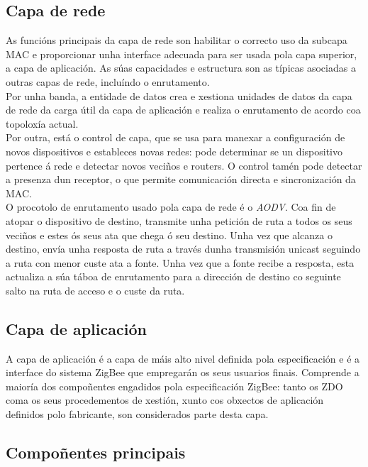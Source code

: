  \subsection{Capa de rede}

 As funcións principais da capa de rede son habilitar o correcto uso da subcapa
 MAC e proporcionar unha interface adecuada para ser usada pola capa superior,
 a capa de aplicación. As súas capacidades e estructura son as típicas
 asociadas a outras capas de rede, incluíndo o enrutamento. \\

 Por unha banda, a entidade de datos crea e xestiona unidades de datos da capa
 de rede da carga útil da capa de aplicación e realiza o enrutamento de acordo
 coa topoloxía actual. \\

 Por outra, está o control de capa, que se usa para manexar a configuración de
 novos dispositivos e estableces novas redes: pode determinar se un dispositivo
 pertence á rede e detectar novos veciños e routers. O control tamén pode
 detectar a presenza dun receptor, o que permite comunicación directa e
 sincronización da MAC. \\

 O procotolo de enrutamento usado pola capa de rede é o \textit{AODV}. Coa fin
 de atopar o dispositivo de destino, transmite unha petición de ruta a todos os
 seus veciños e estes ós seus ata que chega ó seu destino. Unha vez que alcanza
 o destino, envía unha resposta de ruta a través dunha transmisión unicast
 seguindo a ruta con menor custe ata a fonte. Unha vez que a fonte recibe a
 resposta, esta actualiza a súa táboa de enrutamento para a dirección de destino
 co seguinte salto na ruta de acceso e o custe da ruta.

 \subsection{Capa de aplicación}

 A capa de aplicación é a capa de máis alto nivel definida pola especificación
 e é a interface do sistema ZigBee que empregarán os seus usuarios finais.
 Comprende a maioría dos compoñentes engadidos pola especificación ZigBee:
 tanto os ZDO coma os seus procedementos de xestión, xunto cos obxectos de
 aplicación definidos polo fabricante, son considerados parte desta capa.

 \subsection{Compoñentes principais}

